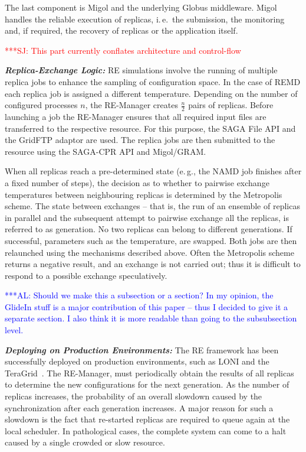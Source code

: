 \documentclass{rspublic}
\newcommand{\alnote}[1]{ {\textcolor{blue} { ***AL: #1 }}}
\newcommand{\jhanote}[1]{ {\textcolor{red} { ***SJ: #1 }}}
\newcommand{\alnote}[1]{}
\newcommand{\jhanote}[1]{}
\newcommand{\remanager}[1]{RE-Manager }
\begin{document}
The last component is Migol and the underlying Globus middleware. 
Migol handles the reliable execution of replicas, i.\,e.\ the submission,
the monitoring and, if required, the recovery of replicas or the application itself. 



\jhanote{This part currently conflates architecture and control-flow}
                       
                                            
{\it \bf Replica-Exchange Logic:} RE simulations involve the running of multiple replica jobs to enhance
the sampling of configuration space. In the case of REMD each replica
job is assigned a different temperature.  Depending on the number of
configured processes $n$, the \remanager\ creates $\frac{n}{2}$ pairs
of replicas.  Before launching a job the \remanager\ ensures that all
required input files are transferred to the respective resource. For
this purpose, the SAGA File API and the GridFTP adaptor are used.  
The replica jobs are then submitted to the resource using the SAGA-CPR API and
Migol/GRAM. 

When all replicas reach a pre-determined state (e.\,g., the NAMD job
finishes after a fixed number of steps), the decision as to whether to
pairwise exchange temperatures between neighbouring replicas is
determined by the Metropolis scheme. %
The state between exchanges -- that is, the run of an ensemble of replicas
in parallel and the subsequent attempt to pairwise exchange all the
replicas, is referred to as generation. No two replicas can belong to
different generations.  If successful, parameters such as the
temperature, are swapped. Both jobs are then relaunched using the
mechanisms described above. Often the Metropolis scheme returns a
negative result, and an exchange is not carried out; thus it is
difficult to respond to a possible exchange speculatively.

\alnote{Should we make this a subsection or a section? In my opinion,
the GlideIn stuff is a major contribution of this paper -- thus I decided to
give it a separate section. I also think it is more readable than going to the
subsubsection level.}           

{\it \bf Deploying on Production Environments:} The RE framework has 
been successfully deployed on production
environments, such as LONI and the TeraGrid~\citep{Luckow:2008la}.
The RE-Manager, must periodically obtain the results of all replicas
to determine the new configurations for the next generation.  As the
number of replicas increases, the probability of an overall slowdown
caused by the synchronization after each
generation increases.  A major reason for such a slowdown is the fact that
re-started replicas are required to queue again at
the local scheduler.  In pathological cases, the complete system can
come to a halt caused by a single crowded or slow resource.
\end{document}
